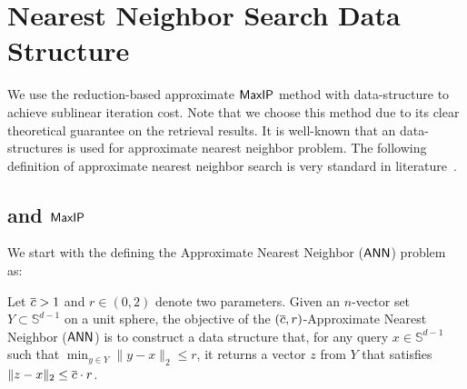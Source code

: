 \section{Nearest Neighbor Search Data Structure}\label{sec:nearest_neighbor}



We use the reduction-based approximate $\mathsf{MaxIP}$ method with {\lsh} data-structure to achieve sublinear iteration cost. 
Note that we choose this method due to its clear theoretical guarantee on the retrieval results. It is well-known that an {\lsh} data-structures is used for approximate nearest neighbor problem. 
The following definition of approximate nearest neighbor search is very standard in literature~\cite{am93,im98,diim04,ainr14,ailrs15,ar15,iw18,alrw17,air18,dirw19,ccd+20,pmlr-v162-li22m,li2019re}.











\subsection{\texorpdfstring{{\lsh}}{~} and \texorpdfstring{$\mathsf{MaxIP}$}{~}}

We start with the defining the Approximate  Nearest Neighbor ($\mathsf{ANN}$) problem~\cite{am93,im98,diim04,ainr14,ailrs15,ar15,iw18,alrw17,air18,dirw19,ccd+20} as:
\begin{definition}\label{def:ann:formal}
Let $\overline{c} >1$ and $r \in (0,2)$ denote two parameters.  Given an $n$-vector set $Y \subset \mathbb{S}^{d-1}$ on a unit sphere, the objective of the $(\overline{c},r)$-Approximate Nearest Neighbor ($\mathsf{ANN}$) is to construct a data structure that, for any query $x \in \mathbb{S}^{d-1}$ such that $\min_{y\in Y}\| y - x \|_2 \leq r$, it returns a vector $z$ from $Y$ that satisfies $\| z - x \|_2 \leq \overline{c} \cdot r$.
\end{definition}

